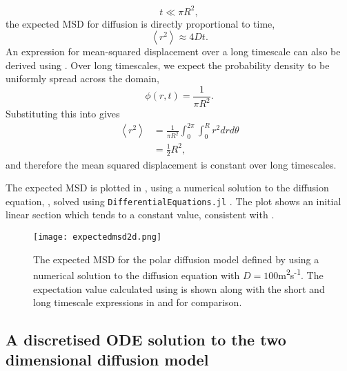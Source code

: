 %
\begin{equation}
t \ll \pi R^2,
\end{equation}
%
the expected MSD for diffusion is directly proportional to time,
%
\begin{equation}
\left<r^2\right> \approx 4Dt.
\label{eqn:diffusion_short2d}
\end{equation}
%
An expression for mean-squared displacement over a long timescale can also be derived using . Over long timescales, we expect the probability density to be uniformly spread across the domain,
%
\begin{equation}
\phi(r,t) = \frac{1}{\pi R^2} .
\end{equation}
%
Substituting this into  gives
%
\begin{align}
\left<r^2\right> &= \frac{1}{\pi R^2}\int_{0}^{2\pi} \int_{0}^{R} r^2 dr d\theta \nonumber \\
&= \frac{1}{2} R^2,
\label{eqn:diffusion_long2d}
\end{align}
%
and therefore the mean squared displacement is constant over long timescales.

The expected MSD is plotted in , using a numerical solution to the
diffusion equation, , solved using \texttt{DifferentialEquations.jl} \cite{DifferentialEquations}. The plot shows an initial linear section which tends to a constant value, consistent with .
%
\begin{figure} [t]
    \centering
        \texttt{[image: expectedmsd2d.png]}
        \caption{The expected MSD for the polar diffusion model defined by  using a numerical solution to the diffusion equation with $D=100$m\textsuperscript{2}s\textsuperscript{-1}. The expectation value calculated using  is shown along with the short and long timescale expressions in  and  for comparison.}
        \label{fig:expectedmsd2d}
\end{figure}


\subsection{A discretised ODE solution to the two dimensional diffusion model}

